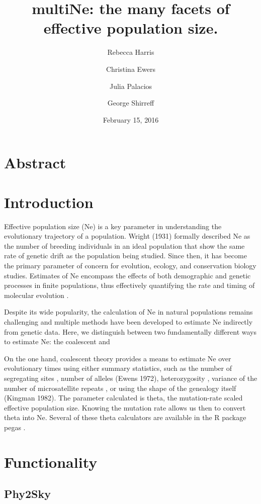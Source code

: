 \documentclass[english,titlepage]{article}
\author[1]{Rebecca Harris}
\author[2]{Christina Ewers}
\author[3]{Julia Palacios}
\author[4]{George Shirreff}
\affil[2]{University of Georgia}
\affil[1]{Department of Biology, University of Washington}
\affil[3]{Harvard University}
\affil[4]{Imperial College London}
\date{February 15, 2016}
\title{multiNe: the many facets of effective population size.}
\begin{document}


\maketitle

\section{Abstract}
\section{Introduction}

Effective population size (Ne) is a key parameter in understanding the evolutionary trajectory of a population. Wright (1931) formally described Ne as the number of breeding individuals in an ideal population that show the same rate of genetic drift as the population being studied. Since then, it has become the primary parameter of concern for evolution, ecology, and conservation biology studies. Estimates of Ne encompass the effects of both demographic and genetic processes in finite populations, thus effectively quantifying the rate and timing of molecular evolution \citep{Caballero1994}. 

Despite its wide popularity, the calculation of Ne in natural populations remains challenging and multiple methods have been developed to estimate Ne indirectly from genetic data. Here, we distinguish between two fundamentally different ways to estimate Ne: the coalescent and 


On the one hand, coalescent theory provides a means to estimate Ne over evolutionary times using either summary statistics, such as the number of segregating sites \cite{Watterson1975}, number of alleles (Ewens 1972), heterozygosity \citep{Kimmel1998}, variance of the number of microsatellite repeats \citep{Kimmel1998}, or using the shape of the genealogy itself (Kingman 1982). The parameter calculated is theta, the mutation-rate scaled effective population size. Knowing the mutation rate allows us then to convert theta into Ne. Several of these theta calculators are available in the R package pegas \citep{Paradis2004}. 

\section{Functionality}

\subsection{Phy2Sky}
\end{document}
